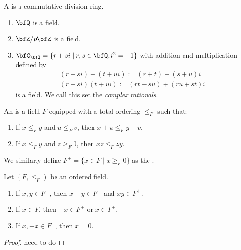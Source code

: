     \begin{definition}
        A  is a commutative division ring.
    \end{definition}

    \begin{example}
        \phantom{a}
        \begin{enumerate}[label = (\arabic*)]
            \item $\bfQ$ is a field.
            \item $\bfZ/p \bfZ$ is a field.
            \item $\bfC_\bfQ = \{r+si \mid r,s \in \bfQ , i^2 = -1\}$ with addition and multiplication defined by
                \begin{equation*}
                \begin{split}
                    (r+si) + (t+ui) := (r+t) + (s+u)i \\
                    (r+si)(t+ui) := (rt-su) + (ru+st)i
                \end{split}
                \end{equation*}
            is a field. We call this set the \textit{complex rationals}. 
        \end{enumerate}
    \end{example}

    \begin{definition}
        An  is a field $F$ equipped with a total ordering $\leq_F$ such that:
            \begin{enumerate}[label = (\arabic*)]
                \item If $x \leq_F y$ and $u \leq_F v$, then $x+u \leq_F y+v$.
                \item If $x \leq_F y$ and $z \geq_F 0$, then $xz \leq_F zy$.
            \end{enumerate}
        We similarly define $F^+ = \{x \in F \mid x \geq_F 0\}$ as the .
    \end{definition}

    \begin{proposition}
        Let $(F,\leq_F)$ be an ordered field.
        \begin{enumerate}[label = (\arabic*)]
            \item If $x,y \in F^+$, then $x+y \in F^+$ and $xy \in F^+$.
            \item If $x \in F$, then $-x \in F^+$ or $x \in F^+$.
            \item If $x,-x \in F^+$, then $x = 0$.
        \end{enumerate}
    \end{proposition}
        {\color{red} \begin{proof}
            need to do
        \end{proof}}

